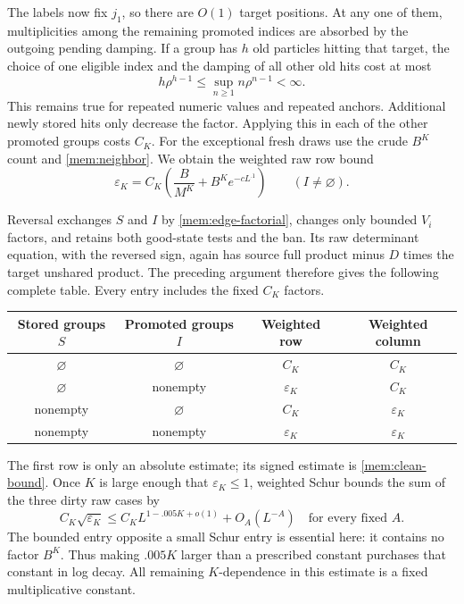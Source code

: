 The labels now fix $j_1$, so there are $O(1)$ target positions. At any
one of them, multiplicities among the remaining promoted indices are
absorbed by the outgoing pending damping. If a group has $h$ old
particles hitting that target, the choice of one eligible index and
the damping of all other old hits cost at most
\begin{equation}\label{mem:index-damping}
 h\rho^{h-1}\le\sup_{n\ge1}n\rho^{n-1}<\infty.
\end{equation}
This remains true for repeated numeric values and repeated anchors.
Additional newly stored hits only decrease the factor. Applying this
in each of the other promoted groups costs $C_K$. For the exceptional
fresh draws use the crude $B^K$ count and
\eqref{mem:neighbor}. We obtain the weighted raw row bound
\begin{equation}\label{mem:epsilon}
 \varepsilon_K=C_K\left(\frac{B}{M^K}
                         +B^K e^{-cL^{.1}}\right)
 \qquad(I\ne\varnothing).
\end{equation}

Reversal exchanges $S$ and $I$ by \eqref{mem:edge-factorial}, changes
only bounded $V_i$ factors, and retains both good-state tests and the
ban. Its raw determinant equation, with the reversed sign, again has
source full product minus $D$ times the target unshared product.
The preceding argument therefore gives the following complete table.
Every entry includes the fixed $C_K$ factors.
\begin{center}
\begin{tabular}{cccc}
\toprule
Stored groups $S$ & Promoted groups $I$ & Weighted row & Weighted column\\
\midrule
$\varnothing$ & $\varnothing$ & $C_K$ & $C_K$\\
$\varnothing$ & nonempty & $\varepsilon_K$ & $C_K$\\
nonempty & $\varnothing$ & $C_K$ & $\varepsilon_K$\\
nonempty & nonempty & $\varepsilon_K$ & $\varepsilon_K$\\
\bottomrule
\end{tabular}
\end{center}
The first row is only an absolute estimate; its signed estimate is
\eqref{mem:clean-bound}. Once $K$ is large enough that
$\varepsilon_K\le1$, weighted Schur bounds the sum of the three dirty
raw cases by
\begin{equation}\label{mem:raw-dirty-norm}
 C_K\sqrt{\varepsilon_K}
 \le C_K L^{1-.005K+o(1)}+O_A(L^{-A})
 \quad\text{for every fixed }A.
\end{equation}
The bounded entry opposite a small Schur entry is essential here: it
contains no factor $B^K$. Thus making $.005K$ larger than a prescribed
constant purchases that constant in log decay. All remaining
$K$-dependence in this estimate is a fixed multiplicative constant.

